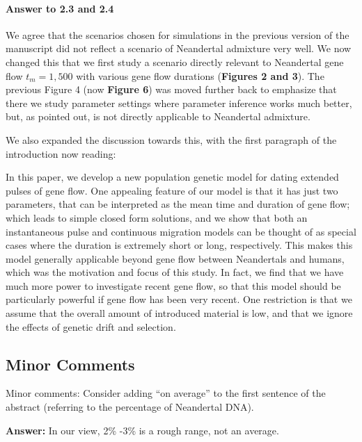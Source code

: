 \documentclass[11pt]{article}
\let\oldparagraph\paragraph
\renewcommand{\paragraph}[1]{\oldparagraph{#1}\mbox{}}
\begin{document}
\paragraph{Answer to 2.3 and 2.4}
We agree that the scenarios chosen for simulations in the previous version of the manuscript did not reflect a scenario of Neandertal admixture very well. We now changed this that we first study a scenario directly relevant to Neandertal gene flow $t_m=1,500$  with various gene flow durations (\textbf{Figures 2 and 3}). The previous Figure 4 (now \textbf{Figure 6}) was moved further back to emphasize that there we study parameter settings where parameter inference works much better, but, as pointed out, is not directly applicable to Neandertal admixture.

We also expanded  the discussion towards this, with the  first paragraph of the introduction now reading:

\begin{mdframed}[hidealllines=true,backgroundcolor=grey!20]
In this paper, we develop a new population genetic model for dating extended pulses of gene flow. One appealing feature of our model is that it has just two parameters, that can be interpreted as the mean time and duration of gene flow; which leads to simple closed form solutions, and we show that both an instantaneous pulse and continuous migration models can be thought of as special cases where the duration is extremely short or long, respectively. This makes this model generally applicable beyond gene flow between Neandertals and humans, which was the motivation and focus of this study. In fact, we find that we have much more power to investigate recent gene flow, so that this model should be particularly powerful if gene flow has been very recent. One restriction is that we assume that the overall amount of introduced material is low, and that we ignore the effects of genetic drift and selection.\end{mdframed}



\subsection{Minor Comments}\label{Minor Comments}

Minor comments:
Consider adding “on average” to the first sentence of the abstract (referring to the percentage of Neandertal DNA).

\textbf{Answer:} In our view, 2\% -3\% is a rough range, not an average.
\end{document}
